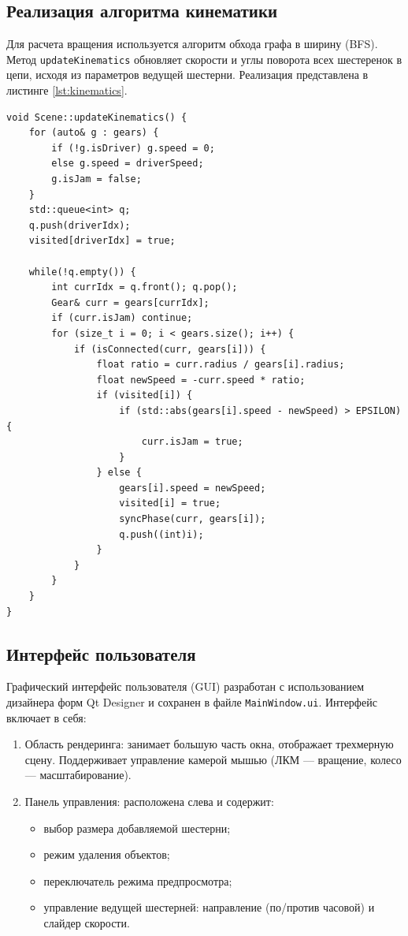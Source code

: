 \subsection{Реализация алгоритма кинематики}

Для расчета вращения используется алгоритм обхода графа в ширину (BFS). Метод \texttt{updateKinematics} обновляет скорости и углы поворота всех шестеренок в цепи, исходя из параметров ведущей шестерни. Реализация представлена в листинге \ref{lst:kinematics}.

\begin{lstlisting}[caption={Реализация алгоритма расчета кинематики}, label={lst:kinematics}]
void Scene::updateKinematics() {
    for (auto& g : gears) {
        if (!g.isDriver) g.speed = 0;
        else g.speed = driverSpeed;
        g.isJam = false;
    }
    std::queue<int> q;
    q.push(driverIdx);
    visited[driverIdx] = true;

    while(!q.empty()) {
        int currIdx = q.front(); q.pop();
        Gear& curr = gears[currIdx];
        if (curr.isJam) continue;
        for (size_t i = 0; i < gears.size(); i++) {
            if (isConnected(curr, gears[i])) {
                float ratio = curr.radius / gears[i].radius;
                float newSpeed = -curr.speed * ratio;
                if (visited[i]) {
                    if (std::abs(gears[i].speed - newSpeed) > EPSILON) {
                        curr.isJam = true;
                    }
                } else {
                    gears[i].speed = newSpeed;
                    visited[i] = true;
                    syncPhase(curr, gears[i]);
                    q.push((int)i);
                }
            }
        }
    }
}
\end{lstlisting}

\subsection{Интерфейс пользователя}

Графический интерфейс пользователя (GUI) разработан с использованием дизайнера форм Qt Designer и сохранен в файле \texttt{MainWindow.ui}. Интерфейс включает в себя:
\begin{enumerate}
	\item Область рендеринга: занимает большую часть окна, отображает трехмерную сцену. Поддерживает управление камерой мышью (ЛКМ — вращение, колесо — масштабирование).
	\item Панель управления: расположена слева и содержит:
	      \begin{itemize}
		      \item выбор размера добавляемой шестерни;
		      \item режим удаления объектов;
		      \item переключатель режима предпросмотра;
		      \item управление ведущей шестерней: направление (по/против часовой) и слайдер скорости.
	      \end{itemize}
\end{enumerate}

